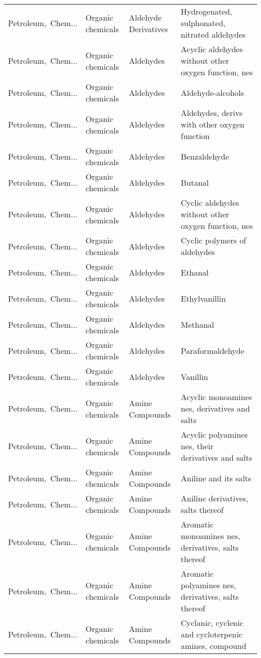 \begin{appendices}
\begin{xltabular}{\textwidth}{|p{0.10\textwidth}|p{0.25\textwidth}|p{0.24\textwidth}|p{0.31\textwidth}|}
Petroleum,\ Chem... & Organic chemicals & Aldehyde Derivatives & Hydrogenated, sulphonated, nitrated aldehydes \\
Petroleum,\ Chem... & Organic chemicals & Aldehydes & Acyclic aldehydes without other oxygen function, nes \\
Petroleum,\ Chem... & Organic chemicals & Aldehydes & Aldehyde-alcohols \\
Petroleum,\ Chem... & Organic chemicals & Aldehydes & Aldehydes, derivs with other oxygen function \\
Petroleum,\ Chem... & Organic chemicals & Aldehydes & Benzaldehyde \\
Petroleum,\ Chem... & Organic chemicals & Aldehydes & Butanal \\
Petroleum,\ Chem... & Organic chemicals & Aldehydes & Cyclic aldehydes without other oxygen function, nes \\
Petroleum,\ Chem... & Organic chemicals & Aldehydes & Cyclic polymers of aldehydes \\
Petroleum,\ Chem... & Organic chemicals & Aldehydes & Ethanal \\
Petroleum,\ Chem... & Organic chemicals & Aldehydes & Ethylvanillin \\
Petroleum,\ Chem... & Organic chemicals & Aldehydes & Methanal  \\
Petroleum,\ Chem... & Organic chemicals & Aldehydes & Paraformaldehyde \\
Petroleum,\ Chem... & Organic chemicals & Aldehydes & Vanillin \\
Petroleum,\ Chem... & Organic chemicals & Amine Compounds & Acyclic monoamines nes, derivatives and salts \\
Petroleum,\ Chem... & Organic chemicals & Amine Compounds & Acyclic polyamines nes, their derivatives and salts \\
Petroleum,\ Chem... & Organic chemicals & Amine Compounds & Aniline and its salts \\
Petroleum,\ Chem... & Organic chemicals & Amine Compounds & Aniline derivatives, salts thereof \\
Petroleum,\ Chem... & Organic chemicals & Amine Compounds & Aromatic monoamines nes, derivatives, salts thereof \\
Petroleum,\ Chem... & Organic chemicals & Amine Compounds & Aromatic polyamines nes, derivatives, salts thereof \\
Petroleum,\ Chem... & Organic chemicals & Amine Compounds & Cyclanic, cyclenic and cycloterpenic amines, compound \\

\end{xltabular}
\end{appendices}
